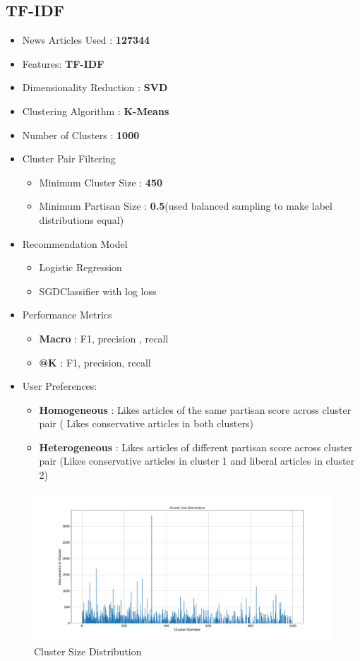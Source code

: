 \documentclass[a4paper,fontsize=8.0pt]{scrartcl}
\begin{document}
\subsection{TF-IDF}
\begin{flushleft}
\begin{itemize}
  \item News Articles Used : \textbf{127344}
  \item Features: \textbf{TF-IDF}
  \item Dimensionality Reduction : \textbf{SVD}
  \item Clustering Algorithm : \textbf{K-Means}
  \item Number of Clusters : \textbf{1000}
  \item Cluster Pair Filtering 
  \begin{itemize}
      \item Minimum Cluster Size : \textbf{450}
      \item Minimum Partisan Size : \textbf{0.5}(used balanced sampling to make label distributions equal)
  \end{itemize}
  \item Recommendation Model
  \begin{itemize}
      \item Logistic Regression
      \item SGDClassifier with log loss
  \end{itemize}
  \item Performance Metrics
  \begin{itemize}
      \item \textbf{Macro} : F1, precision , recall
      \item \textbf{@K} : F1, precision, recall
  \end{itemize}
  \item User Preferences:
  \begin{itemize}
      \item \textbf{Homogeneous} : Likes articles of the same partisan score across cluster pair ( Likes conservative articles in both clusters)
      \item \textbf{Heterogeneous} : Likes articles of different partisan score across cluster pair (Likes conservative articles in cluster 1 and liberal articles in cluster 2)
  \end{itemize}
\end{itemize}
\begin{figure}[H]
 \centering
 \includegraphics[width=1.0\textwidth]{Graphs/cluster_size_dist.pdf}
 \caption{Cluster Size Distribution}
\end{figure}
\end{flushleft}
\end{document}
